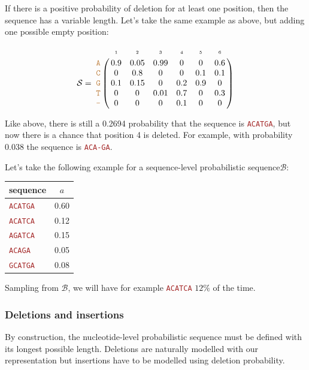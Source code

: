 \documentclass[10pt]{article}
\newcommand{\sq}[1]{\texttt{\textcolor{brown}{#1}}}
\newcommand{\sps}{\mathcal{B}} %
\newcommand{\nps}{\mathcal{S}} %
\newcommand{\nlps}{nucleotide-level probabilistic sequence\xspace}
\newcommand{\slps}{sequence-level probabilistic sequence\xspace}
\begin{document}
If there is a positive probability of deletion for at least one position, then the sequence has a variable length. 
Let's take the same example as above, but adding one possible empty position:

$$
\nps = 
\bordermatrix{
&\scriptscriptstyle{1} & \scriptscriptstyle{2}& \scriptscriptstyle{3}& \scriptscriptstyle{4} & \scriptscriptstyle{5} & \scriptscriptstyle{6} \cr
\sq{A} & 0.9 & 0.05   & 0.99 & 0 & 0 & 0.6\cr
\sq{C} & 0   & 0.8 & 0 & 0 & 0.1 & 0.1\cr
\sq{G} & 0.1 & 0.15 & 0 & 0.2 & 0.9 & 0\cr
\sq{T} & 0 & 0 & 0.01 & 0.7 & 0 & 0.3\cr
\sq{-} & 0 & 0 & 0 & 0.1 & 0 & 0\cr
}
$$

\noindent Like above, there is still a 0.2694 probability that the sequence is \sq{ACATGA}, but now there is a chance that position 4 is deleted. For example, with probability 0.038 the sequence is \sq{ACA-GA}.

Let's take the following example for a \slps $\sps$:
\begin{table}[H]
\begin{center}
\begin{tabular}{lc}
\hline
\textbf{sequence} & $a$ \\
\hline
\sq{ACATGA} & 0.60 \\
\sq{ACATCA} & 0.12 \\
\sq{AGATCA} & 0.15 \\
\sq{ACAGA}  & 0.05 \\
\sq{GCATGA} & 0.08 \\
\hline
\end{tabular}
\end{center}
\label{default}
\end{table}%
Sampling from $\sps$, we will have for example \sq{ACATCA} $12\%$ of the time. 

\subsubsection{Deletions and insertions}

By construction, the \nlps must be defined with its longest possible length. Deletions are naturally modelled with our representation but insertions have to be modelled using deletion probability. 
\end{document}
